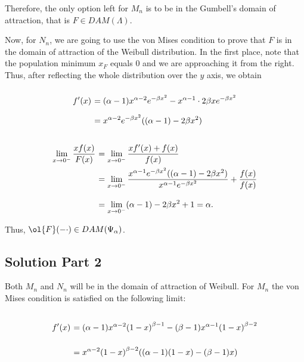 Therefore, the only option left for $M_n$ is to be in the Gumbell's domain of attraction, that is $F \in DAM(\Lambda)$.

Now, for $N_n$, we are going to use the von Mises condition to prove that $F$ is in the domain of attraction of the Weibull distribution. In the first place, note that the population minimum $x_F$ equals $0$ and we are approaching it from the right. Thus, after reflecting the whole distribution over the $y$ axis, we obtain

\[ \everymath{\displaystyle}
\arraycolsep=1.8pt\def\arraystretch{2}
\begin{array}{rl}
    f'(x) & = (\alpha-1)x^{\alpha-2} e^{-\beta x^2} - x^{\alpha-1} \cdot 2\beta x e^{-\beta x^2}\\
    & = x^{\alpha-2} e^{-\beta x^2}((\alpha-1)-2\beta x^2)
\end{array} \]

\[ \everymath{\displaystyle}
\arraycolsep=1.8pt\def\arraystretch{2.5}
\begin{array}{rl}
    \lim_{x\to 0^-} \frac{x f(x)}{F(x)}& = \lim_{x\to 0^-} \frac{xf'(x) + f(x)}{f(x)}\\
    & = \lim_{x\to 0^-} \frac{x^{\alpha-1} e^{-\beta x^2}((\alpha-1)-2\beta x^2)}{x^{\alpha-1} e^{-\beta x^2}} + \frac{f(x)}{f(x)}\\
    & = \lim_{x\to 0^-} (\alpha - 1) - 2\beta x^2 +1 = \alpha.
\end{array} \]

Thus, $\ol{F}(-\cdot) \in DAM(\Psi_\alpha)$.

\subsection*{Solution Part 2}

Both $M_n$ and $N_n$ will be in the domain of attraction of Weibull. For $M_n$ the von Mises condition is satisfied on the following limit:

\[ \everymath{\displaystyle}
\arraycolsep=1.8pt\def\arraystretch{2.5}
\begin{array}{rl}
    f'(x) & = (\alpha-1) x^{\alpha-2}{(1-x)}^{\beta-1} - (\beta -1) x^{\alpha-1}{(1-x)}^{\beta-2}\\
    & = x^{\alpha-2}{(1-x)}^{\beta-2}((\alpha-1)(1-x)-(\beta-1)x)
\end{array}\]

